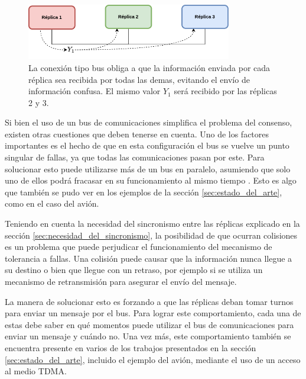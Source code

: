\begin{figure}[htb]
    \centering
    \includegraphics[width=0.8\textwidth]{img/TMR_bus.png}
    \caption{La conexión tipo bus obliga a que la información enviada por cada réplica sea recibida por todas las demas, evitando el envío de información confusa. El mismo valor $Y_1$ será recibido por las réplicas 2 y 3.}
    \label{fig:TMR_bus}    
\end{figure}


Si bien el uso de un bus de comunicaciones simplifica el problema del consenso, existen otras cuestiones que deben tenerse en cuenta. Uno de los factores importantes es el hecho de que en esta configuración el bus se vuelve un punto singular de fallas, ya que todas las comunicaciones pasan por este. Para solucionar esto puede utilizarse más de un bus en paralelo, asumiendo que solo uno de ellos podrá fracasar en su funcionamiento al mismo tiempo \cite[p.~157]{kopetz-2011}. Esto es algo que también se pudo ver en los ejemplos de la sección \ref{sec:estado_del_arte}, como en el caso del avión.

Teniendo en cuenta la necesidad del sincronismo entre las réplicas explicado en la sección \ref{sec:necesidad_del_sincronismo}, la posibilidad de que ocurran colisiones es un problema que puede perjudicar el funcionamiento del mecanismo de tolerancia a fallas. Una colisión puede causar que la información nunca llegue a su destino o bien que llegue con un retraso, por ejemplo si se utiliza un mecanismo de retransmisión para asegurar el envío del mensaje.

La manera de solucionar esto es forzando a que las réplicas deban tomar turnos para enviar un mensaje por el bus. Para lograr este comportamiento, cada una de estas debe saber en qué momentos puede utilizar el bus de comunicaciones para enviar un mensaje y cuándo no. Una vez más, este comportamiento también se encuentra presente en varios de los trabajos presentados en la sección \ref{sec:estado_del_arte}, incluido el ejemplo del avión, mediante el uso de un acceso al medio TDMA.

